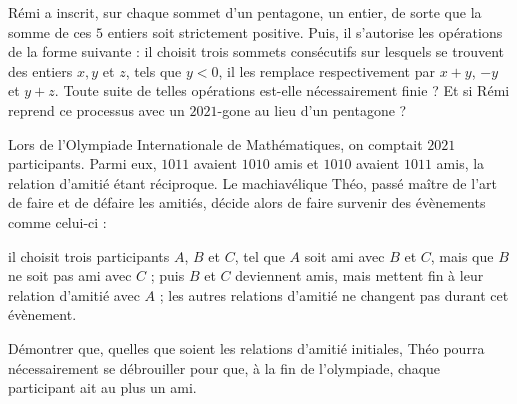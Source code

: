 \begin{exo}[IMO 1986 P3]
Rémi a inscrit, sur chaque sommet d'un pentagone, un entier, de sorte que la somme de ces $5$ entiers soit strictement positive. Puis, il s'autorise les opérations de la forme suivante : il choisit trois sommets consécutifs sur lesquels se trouvent des entiers $x,y$ et $z$, tels que $y<0$, il les remplace respectivement par $x+y$, $-y$ et $y+z$. Toute suite de telles opérations est-elle nécessairement finie ? Et si Rémi reprend ce processus avec un $2021$-gone au lieu d'un pentagone ?
\end{exo}


\begin{exo}[IMO 2019 P3]
Lors de l'Olympiade Internationale de Mathématiques, on comptait $2021$ participants. Parmi eux, $1011$ avaient $1010$ amis et $1010$ avaient $1011$ amis, la relation d'amitié étant réciproque. Le machiavélique Théo, passé maître de l'art de faire et de défaire les amitiés, décide alors de faire survenir des évènements comme celui-ci : 

il choisit trois participants $A$, $B$ et $C$, tel que $A$ soit ami avec $B$ et $C$, mais que $B$ ne soit pas ami avec $C$ ; puis $B$ et $C$ deviennent amis, mais mettent fin à leur relation d'amitié avec $A$ ; les autres relations d'amitié ne changent pas durant cet évènement.

Démontrer que, quelles que soient les relations d'amitié initiales, Théo pourra nécessairement se débrouiller pour que, à la fin de l'olympiade, chaque participant ait au plus un ami.
\end{exo}